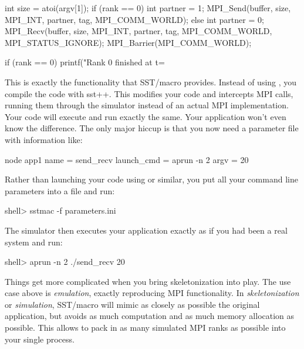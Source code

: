 \begin{CppCode}
int size = atoi(argv[1]);
if (rank == 0){
 int partner = 1;
  MPI_Send(buffer, size, MPI_INT, partner, tag, MPI_COMM_WORLD);
} else {
  int partner = 0;
  MPI_Recv(buffer, size, MPI_INT, partner, tag, MPI_COMM_WORLD, MPI_STATUS_IGNORE);
}
MPI_Barrier(MPI_COMM_WORLD);

if (rank == 0){
  printf("Rank 0 finished at t=%
}
\end{CppCode}

This is exactly the functionality that SST/macro provides.
Instead of using , you compile the code with {sst++}.
This modifies your code and intercepts MPI calls, running them through the simulator instead of an actual MPI implementation.
Your code will execute and run exactly the same.
Your application won't even know the difference.
The only major hiccup is that you now need a parameter file with information like:

\begin{ViFile}
node {
 app1 {
  name = send_recv
  launch_cmd = aprun -n 2
  argv = 20
 }
}
\end{ViFile}
Rather than launching your code using  or similar, you put all your command line parameters into a  file and run:

\begin{ShellCmd}
shell> sstmac -f parameters.ini
\end{ShellCmd}
The simulator then executes your application exactly as if you had been a real system and run:

\begin{ShellCmd}
shell> aprun -n 2 ./send_recv 20
\end{ShellCmd}
Things get more complicated when you bring skeletonization into play.
The use case above is \emph{emulation}, exactly reproducing MPI functionality.
In \emph{skeletonization} or \emph{simulation}, SST/macro will mimic as closely as possible the original application,
but avoids as much computation and as much memory allocation as possible.
This allows to pack in as many simulated MPI ranks as possible into your single  process.